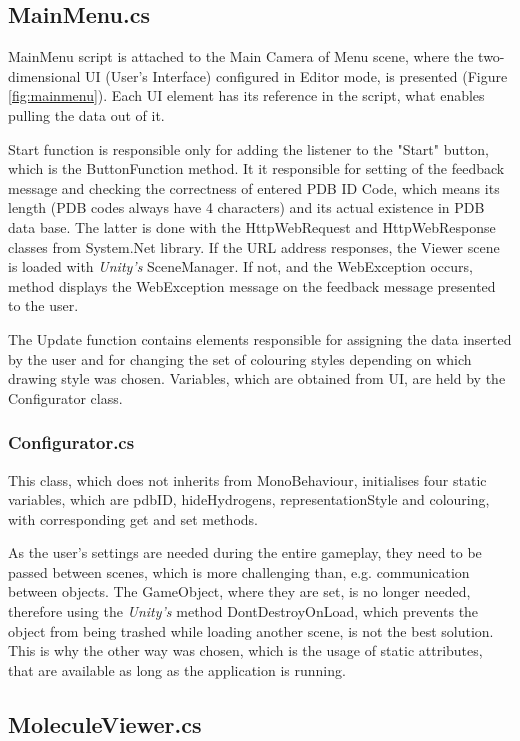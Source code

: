 \subsection{MainMenu.cs}

MainMenu script is attached to the Main Camera of Menu scene, where the two-dimensional UI (User's Interface) configured in Editor mode, is presented (Figure \ref{fig:mainmenu}). Each UI element has its reference in the script, what enables pulling the data out of it. 

Start function is responsible only for adding the listener to the "Start" button, which is the ButtonFunction method. It it responsible for setting of the feedback message and checking the correctness of entered PDB ID Code, which means its length (PDB codes always have 4 characters) and its actual existence in PDB data base. The latter is done with the HttpWebRequest and HttpWebResponse classes from System.Net library. If the URL address responses, the Viewer scene is loaded with \textit{Unity's} SceneManager. If not, and the WebException occurs, method displays the WebException message on the feedback message presented to the user.

The Update function contains elements responsible for assigning the data inserted by the user and for changing the set of colouring styles depending on which drawing style was chosen. Variables, which are obtained from UI, are held by the Configurator class.

\subsubsection{Configurator.cs}

This class, which does not inherits from MonoBehaviour, initialises four static variables, which are pdbID, hideHydrogens, representationStyle and colouring, with corresponding get and set methods. 

As the user's settings are needed during the entire gameplay, they need to be passed between scenes, which is more challenging than, e.g. communication between objects. The GameObject, where they are set, is no longer needed, therefore using the \textit{Unity's} method DontDestroyOnLoad, which prevents the object from being trashed while loading another scene, is not the best solution. This is why the other way was chosen, which is the usage of static attributes, that are available as long as the application is running. 

\subsection{MoleculeViewer.cs}

